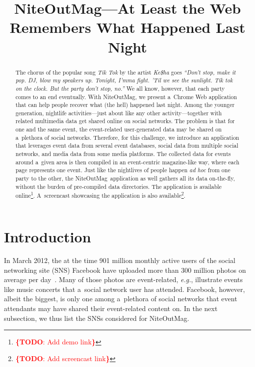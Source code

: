 \documentclass{acm_proc_article-sp}
\let\oldemph\emph
\renewcommand{\emph}[1]{\oldemph{\fontsize{9}{9}\selectfont #1}}
\newcommand{\todo}[1]{\noindent\textcolor{red}{{\bf \{TODO}: #1{\bf \}}}}
\begin{document}
\title{NiteOutMag\hspace{-1.5pt}---At Least the Web\\ Remembers What Happened Last Night}

\author{
}
\maketitle

\begin{abstract}
The chorus of the popular song \emph{Tik Tok} by the artist \emph{Ke\$ha} goes
\emph{``Don't stop, make it pop. DJ, blow my speakers up. Tonight, I'mma fight.
'Til we see the sunlight. Tik tok on the clock. But the party don't stop, no.''}
We all know, however, that each party comes to an end eventually.
With NiteOutMag\texttrademark, we present a~Chrome Web application
that can help people recover what (the hell) happened last night.
Among the younger generation, nightlife activities---just about like any other
activity---together with related multimedia data get shared online on social networks.
The problem is that for one and the same event, the event-related user-generated data
may be shared on a~plethora of social networks.
Therefore, for this challenge, we introduce an application
that leverages event data from several event databases,
social data from multiple social networks, and media data from some media platforms.
The collected data for events around a~given area is then compiled
in an event-centric magazine-like way, where each page represents one event.
Just like the nightlives of people happen \emph{ad hoc} from one party to the other,
the NiteOutMag\texttrademark~application as well
gathers all its data on-the-fly, without the burden of pre-compiled data directories.
The application is available online\footnote{\todo{Add demo link}}.
A~screencast showcasing the application is also available\footnote{\todo{Add screencast link}}.
\end{abstract}




\section{Introduction}
In March 2012, the at the time 901 million monthly active users
of the social networking site (SNS) Facebook
have uploaded more than 300 million photos on average per day~\cite{Facebook2012}.
Many of those photos are event-related, \emph{e.g.},
illustrate events like music concerts that a~social network user has attended.
Facebook, however, albeit the biggest, is only one among a~plethora of social networks
that event attendants may have shared their event-related content on.
In the next subsection, we thus list the SNSs considered for
NiteOutMag\texttrademark.
\end{document}
